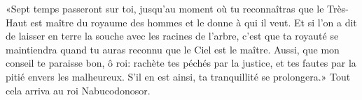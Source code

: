 «Sept temps passeront sur toi,
	jusqu’au moment où tu reconnaîtras que le Très-Haut est maître du royaume des hommes
	et le donne à qui il veut.
Et si l’on a dit de laisser en terre la souche avec les racines de l’arbre,
	c’est que ta royauté se maintiendra quand tu auras reconnu que le Ciel est le maître.
Aussi, que mon conseil te paraisse bon, ô roi:
	rachète tes péchés par la justice, et tes fautes par la pitié envers les malheureux.
S’il en est ainsi, ta tranquillité se prolongera.»
Tout cela arriva au roi Nabucodonosor.
